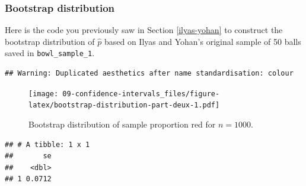 \documentclass[
]{book}
\newenvironment{Shaded}{\begin{snugshade}}{\end{snugshade}}
\newcommand{\CommentTok}[1]{\textcolor[rgb]{0.56,0.35,0.01}{\textit{#1}}}
\newcommand{\DataTypeTok}[1]{\textcolor[rgb]{0.13,0.29,0.53}{#1}}
\newcommand{\DecValTok}[1]{\textcolor[rgb]{0.00,0.00,0.81}{#1}}
\newcommand{\KeywordTok}[1]{\textcolor[rgb]{0.13,0.29,0.53}{\textbf{#1}}}
\newcommand{\NormalTok}[1]{#1}
\newcommand{\OperatorTok}[1]{\textcolor[rgb]{0.81,0.36,0.00}{\textbf{#1}}}
\newcommand{\StringTok}[1]{\textcolor[rgb]{0.31,0.60,0.02}{#1}}
\begin{document}
\hypertarget{bootstrap-distribution}{%
\subsubsection*{Bootstrap distribution}\label{bootstrap-distribution}}

Here is the code you previously saw in Section \ref{ilyas-yohan} to construct the bootstrap distribution of \(\widehat{p}\) based on Ilyas and Yohan's original sample of 50 balls saved in \texttt{bowl\_sample\_1}.

\begin{Shaded}
\end{Shaded}

\begin{verbatim}
## Warning: Duplicated aesthetics after name standardisation: colour
\end{verbatim}

\begin{figure}
\centering
\texttt{[image: 09-confidence-intervals\_files/figure-latex/bootstrap-distribution-part-deux-1.pdf]}
\caption{\label{fig:bootstrap-distribution-part-deux}Bootstrap distribution of sample proportion red for \(n = 1000\).}
\end{figure}

\begin{Shaded}
\end{Shaded}

\begin{verbatim}
## # A tibble: 1 x 1
##       se
##    <dbl>
## 1 0.0712
\end{verbatim}
\end{document}
